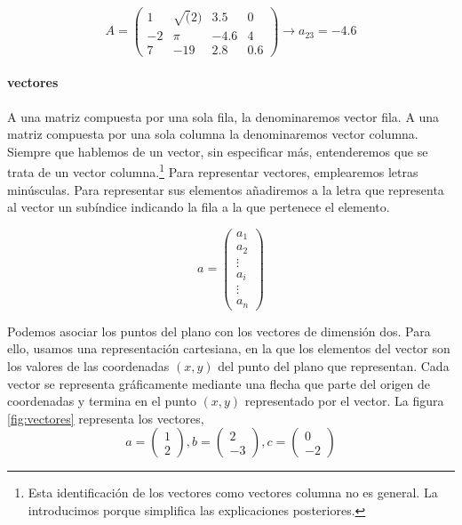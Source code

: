 \begin{equation*}
A=
\begin{pmatrix}
1& \sqrt(2)& 3.5& 0\\
-2& \pi& -4.6& 4\\
7& -19& 2.8& 0.6
\end{pmatrix}
\rightarrow a_{23}=-4.6
\end{equation*}

\paragraph{vectores}
A una matriz compuesta por una sola fila, la denominaremos vector fila. A una matriz compuesta por una sola columna la denominaremos vector columna. Siempre que hablemos de un vector, sin especificar más, entenderemos que se trata de un vector columna.\footnote{Esta identificación de los vectores como vectores columna no es general. La introducimos porque simplifica las explicaciones posteriores.} Para representar vectores, emplearemos letras minúsculas. Para representar sus elementos añadiremos a la letra que representa al vector un subíndice indicando la fila a la que pertenece el elemento.

\begin{equation*}
a=
\begin{pmatrix}
a_1\\
a_2\\
\vdots \\
a_i\\
\vdots \\
a_n
\end{pmatrix}
\end{equation*}

Podemos asociar los puntos del plano con los vectores de dimensión dos. Para ello, usamos una representación cartesiana, en la que los elementos del vector son los valores de las coordenadas $(x,y)$ del punto del plano que representan. Cada vector se representa gráficamente mediante una flecha que parte del origen de coordenadas y termina en el punto $(x,y)$ representado por el vector. La figura \ref{fig:vectores} representa los vectores,
\begin{equation*}
a=
\begin{pmatrix}
1\\
2
\end{pmatrix},
b=
\begin{pmatrix}
2\\
-3
\end{pmatrix},
c=
\begin{pmatrix}
0\\
-2
\end{pmatrix}
\end{equation*}


